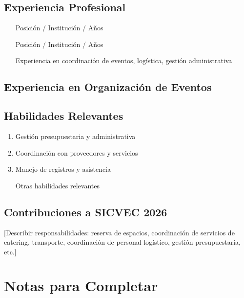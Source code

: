\documentclass[12pt,a4paper]{article}
\begin{document}
\subsection{Experiencia Profesional}

\begin{itemize}[label={\textcolor{verdemid}{\textbullet}}]
  \item [Posición / Institución / Años]
  \item [Posición / Institución / Años]
  \item [Experiencia en coordinación de eventos, logística, gestión administrativa]
\end{itemize}

\subsection{Experiencia en Organización de Eventos}

\begin{tcolorbox}
\end{tcolorbox}

\subsection{Habilidades Relevantes}

\begin{enumerate}[label={\textcolor{verdeosc}{\arabic{*}.}}]
  \item Gestión presupuestaria y administrativa
  \item Coordinación con proveedores y servicios
  \item Manejo de registros y asistencia
  \item [Otras habilidades relevantes]
\end{enumerate}

\subsection{Contribuciones a SICVEC 2026}

[Describir responsabilidades: reserva de espacios, coordinación de servicios de catering, transporte, coordinación de personal logístico, gestión presupuestaria, etc.]

\newpage
\section*{Notas para Completar}
\end{document}
